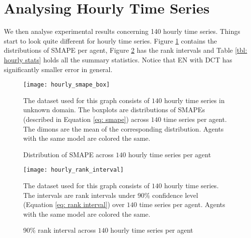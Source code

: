 \section{Analysing Hourly Time Series}
We then analyse experimental results concerning 140 hourly time series. Things start to look quite different for hourly time series. Figure \ref{fig: hourly smape box} contains the distributions of SMAPE per agent, Figure \ref{fig: hourly rank interval} has the rank intervals and Table \ref{tbl: hourly stats} holds all the summary statistics. Notice that EN with DCT has significantly smaller error in general.
\begin{figure}[H]
    \centering
    \texttt{[image: hourly\_smape\_box]}
    \caption{Distribution of SMAPE across $140$ hourly time series per agent}
    {\raggedright \footnotesize The dataset used for this graph consists of $140$ hourly time series in unknown domain. The boxplots are distributions of SMAPEs (described in Equation \ref{eq: smape}) across $140$ time series per agent. The dimons are the mean of the corresponding distribution. Agents with the same model are colored the same. \par}
    \label{fig: hourly smape box}
\end{figure}
\begin{figure}[H]
    \centering
    \texttt{[image: hourly\_rank\_interval]}
    \caption{90\% rank interval across $140$ hourly time series per agent}
    {\raggedright \footnotesize The dataset used for this graph consists of $140$ hourly time series. The intervals are rank intervals under 90\% confidence level (Equation \ref{eq: rank interval}) over $140$ time series per agent. Agents with the same model are colored the same. \par}
    \label{fig: hourly rank interval}
\end{figure}
